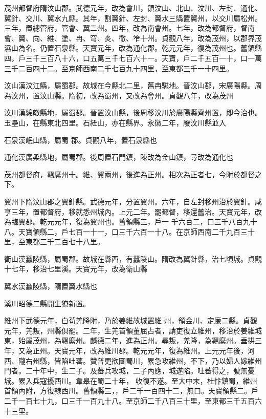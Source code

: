 \begin{pinyinscope}
 茂州都督府隋汶山郡。武德元年，改為會川，領汶山、北山、汶川、左封、通化、翼針、交川、翼水九縣。其年，割翼針、左封、翼水三縣置翼州，以交川屬松州。三年，置總管府，管會、翼二州。四年，改為南會州。七年，改為都督府，督南會、翼、向、維、塗、冉、穹、炎、徹、笮十州。貞觀八年，改為茂州，以郡界茂濕山為名。仍置石泉縣。天寶元年，改為通化郡。乾元元年，復為茂州也。舊領縣四，戶三千三百八十六，口五萬三千七百六十一。天寶，戶二千五百一十，口一萬
 三千二百四十二。至京師西南二千七百九十四里，至東都三千一十四里。



 汶山漢汶江縣，屬蜀郡。故城在今縣北二里，舊冉駹地。晉汶山郡，宋廣陽縣。周為汶州，置汶山縣。隋初，改為蜀州，又改為會州。貞觀八年，改為茂州



 汶川漢綿皦縣地，屬蜀郡。晉置汶山縣，後周移汶川於廣陽縣齊州置，即今治也。玉壘山，在縣東北四里。石紐山，亦在縣界。永徽二年，廢汶川縣並入



 石泉漢岷山縣，屬蜀
 郡。貞觀八年，置石泉縣也



 通化漢廣柔縣地，屬蜀郡。後周置石門鎮，陳改為金山鎮，尋改為通化也



 茂州都督府，羈縻州十。維、翼兩州，後進為正州。相次為正者七，今附於都督之下。



 翼州下隋汶山郡之翼針縣。武德元年，分置翼州。六年，自左封移州治於翼針。咸亨三年，置都督府，移就悉州城內。上元二年。罷都督，移還舊治。天寶元年，改為臨翼郡。乾元元年，復為翼州也。舊領縣三，戶一
 千六百二，口三千八百九十八。天寶領縣二，戶七百一十一，口三千六百一十八。在京師西南二千九百三十里，至東都三千二百七十八里。



 衛山漢蠶陵縣，屬蜀郡。故城在縣西，有蠶陵山。隋改為翼針縣，治七頃城。貞觀十七年，移治七里溪。天寶元年，改為衛山縣



 翼水漢蠶陵縣，隋置翼水縣也



 溪川昭德二縣開生獠新置。



 維州下武德元年，白茍羌降附，乃於姜維故城置維
 州，領金川、定廉二縣。貞觀元年，羌叛，州縣俱罷。二年，生羌首領董屈占者，請吏復立維州，移治於姜維城東，始屬茂州，為羈縻州。麟德二年，進為正州。尋叛，羌降，為羈縻州。垂拱三年，又為正州。天寶元年，改為維川郡。乾元元年，復為維州。上元元年後，河西、隴右州縣，皆陷吐蕃。贊普更欲圖蜀川，累急攻維州，不下，乃以婦人嫁維州門者。二十年中，生二子。及蕃兵攻城，二子內應，城遂陷。吐蕃得之，號無憂城。累入兵寇擾西川。韋皋在蜀二十年，
 收復不遂。至大中末，杜忭鎮蜀，維州首領內附，方復隸西川。舊領縣三，，戶二千一百四十二，無口。天寶領縣二。戶二千一百七十九，口三千一百九十八。至京師二千八百三十里，至東都三千五百六十三里。




\end{pinyinscope}
